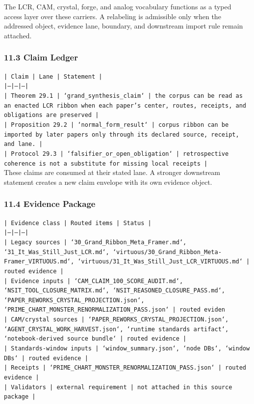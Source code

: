 \documentclass[11pt]{article}
\begin{document}
The LCR, CAM, crystal, forge, and analog vocabulary functions as a typed access
layer over these carriers. A relabeling is admissible only when the addressed
object, evidence lane, boundary, and downstream import rule remain attached.

\subsubsection*{11.3 Claim Ledger}

\noindent\texttt{| Claim | Lane | Statement |}\\
\noindent\texttt{|---|---|---|}\\
\noindent\texttt{| Theorem 29.1 | `grand\_synthesis\_claim` | the corpus can be read as an enacted LCR ribbon when each paper's center, routes, receipts, and obligations are preserved |}\\
\noindent\texttt{| Proposition 29.2 | `normal\_form\_result` | corpus ribbon can be imported by later papers only through its declared source, receipt, and lane. |}\\
\noindent\texttt{| Protocol 29.3 | `falsifier\_or\_open\_obligation` | retrospective coherence is not a substitute for missing local receipts |}\\

These claims are consumed at their stated lane. A stronger downstream statement
creates a new claim envelope with its own evidence object.

\subsubsection*{11.4 Evidence Package}

\noindent\texttt{| Evidence class | Routed items | Status |}\\
\noindent\texttt{|---|---|---|}\\
\noindent\texttt{| Legacy sources | `30\_Grand\_Ribbon\_Meta\_Framer.md`, `31\_It\_Was\_Still\_Just\_LCR.md`, `virtuous/30\_Grand\_Ribbon\_Meta-Framer\_VIRTUOUS.md`, `virtuous/31\_It\_Was\_Still\_Just\_LCR\_VIRTUOUS.md` | routed evidence |}\\
\noindent\texttt{| Evidence inputs | `CAM\_CLAIM\_100\_SCORE\_AUDIT.md`, `NSIT\_TOOL\_CLOSURE\_MATRIX.md`, `NSIT\_REASONED\_CLOSURE\_PASS.md`, `PAPER\_REWORKS\_CRYSTAL\_PROJECTION.json`, `PRIME\_CHART\_MONSTER\_RENORMALIZATION\_PASS.json` | routed eviden}\\
\noindent\texttt{| CAM/crystal sources | `PAPER\_REWORKS\_CRYSTAL\_PROJECTION.json`, `AGENT\_CRYSTAL\_WORK\_HARVEST.json`, `runtime standards artifact`, `notebook-derived source bundle` | routed evidence |}\\
\noindent\texttt{| Standards-window inputs | `window\_summary.json`, `node DBs`, `window DBs` | routed evidence |}\\
\noindent\texttt{| Receipts | `PRIME\_CHART\_MONSTER\_RENORMALIZATION\_PASS.json` | routed evidence |}\\
\noindent\texttt{| Validators | external requirement | not attached in this source package |}\\
\end{document}
